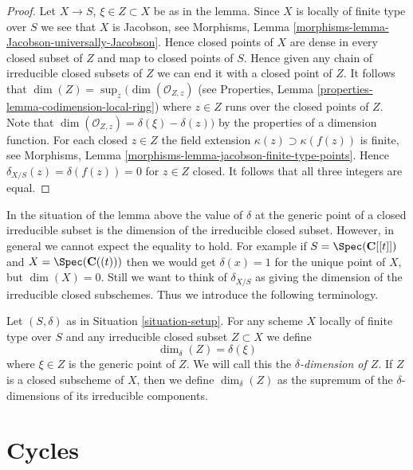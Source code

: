 \begin{proof}
Let $X \to S$, $\xi \in Z \subset X$ be as in the lemma.
Since $X$ is locally of finite type over $S$ we see that
$X$ is Jacobson, see
Morphisms, Lemma \ref{morphisms-lemma-Jacobson-universally-Jacobson}.
Hence closed points of $X$ are dense in every closed subset of $Z$
and map to closed points of $S$. Hence given any chain
of irreducible closed subsets of $Z$ we can end it with a closed point of $Z$.
It follows that $\dim(Z) = \sup_z(\dim(\mathcal{O}_{Z, z})$
(see Properties, Lemma \ref{properties-lemma-codimension-local-ring})
where $z \in Z$ runs over the closed points of $Z$.
Note that $\dim(\mathcal{O}_{Z, z}) = \delta(\xi) - \delta(z))$
by the properties of a dimension function.
For each closed $z \in Z$ the field extension
$\kappa(z) \supset \kappa(f(z))$ is finite, see Morphisms,
Lemma \ref{morphisms-lemma-jacobson-finite-type-points}.
Hence $\delta_{X/S}(z) = \delta(f(z)) = 0$ for $z \in Z$ closed.
It follows that all three integers are equal.
\end{proof}

\noindent
In the situation of the lemma above the
value of $\delta$ at the generic point of a closed irreducible subset
is the dimension of the irreducible closed subset.
However, in general we cannot expect the equality to hold.
For example if $S = \Spec(\mathbf{C}[[t]])$ and
$X = \Spec(\mathbf{C}((t)))$ then we would get
$\delta(x) = 1$ for the unique point of $X$, but $\dim(X) = 0$.
Still we want to think of $\delta_{X/S}$ as giving the
dimension of the irreducible closed subschemes. Thus we introduce
the following terminology.

\begin{definition}
\label{definition-delta-dimension}
Let $(S, \delta)$ as in Situation \ref{situation-setup}.
For any scheme $X$ locally of finite type over $S$
and any irreducible closed subset $Z \subset X$ we define
$$
\dim_\delta(Z) = \delta(\xi)
$$
where $\xi \in Z$ is the generic point of $Z$.
We will call this the {\it $\delta$-dimension of $Z$}.
If $Z$ is a closed subscheme of $X$, then we define
$\dim_\delta(Z)$ as the supremum of the $\delta$-dimensions
of its irreducible components.
\end{definition}







\section{Cycles}
\label{section-cycles}

